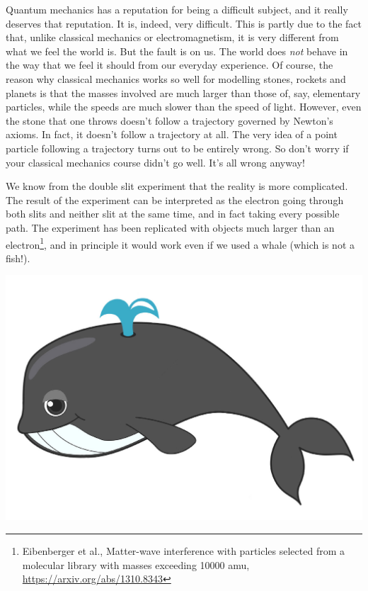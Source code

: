 
Quantum mechanics has a reputation for being a difficult subject, and it really deserves that reputation. It is, indeed, very difficult. This is partly due to the fact that, unlike classical mechanics or electromagnetism, it is very different from what we feel the world is. But the fault is on us. The world does \emph{not} behave in the way that we feel it should from our everyday experience. Of course, the reason why classical mechanics works so well for modelling stones, rockets and planets is that the masses involved are much larger than those of, say, elementary particles, while the speeds are much slower than the speed of light. However, even the stone that one throws doesn't follow a trajectory governed by Newton's axioms. In fact, it doesn't follow a trajectory at all. The very idea of a point particle following a trajectory turns out to be entirely wrong. So don't worry if your classical mechanics course didn't go well. It's all wrong anyway!

We know from the double slit experiment that the reality  is more complicated. The result of the experiment can be interpreted as the electron going through both slits and neither slit at the same time, and in fact taking every possible path. The experiment has been replicated with objects much larger than an electron\footnote{Eibenberger et al., Matter-wave interference with particles selected from a molecular library with masses exceeding 10000 amu, \url{https://arxiv.org/abs/1310.8343}}, and in principle it would work even if we used a whale (which is not a fish!).

\vspace{1cm}
\begin{center}
\includegraphics[scale=0.8]{graphics/clean_whale}
\end{center}




